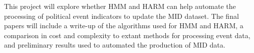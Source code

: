 \documentclass[12pt,letterpaper]{article}
\begin{document}
This project will explore whether HMM and HARM can help automate the processing of political event indicators to update the MID dataset. The final papers will include a write-up of the algorithms used for HMM and HARM, a comparison in cost and complexity to extant methods for processing event data, and preliminary results used to automated the production of MID data.



\setlength{\bibsep}{0.0pt}


\end{document}
